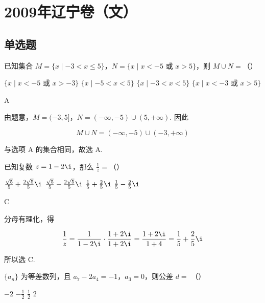 \chapter{2009年辽宁卷（文）}

\section{单选题}

\begin{problem}
已知集合 \(M = \{x \mid -3 < x \leqslant 5\}\)，\(N = \{x \mid x < -5\text{ 或 }x > 5\}\)，则 \(M \cup N =\)（\quad）

\choices
    {\(\{x\mid x < -5\text{ 或 }x > -3\}\)}
    {\(\{x\mid -5 < x < 5\}\)}
    {\(\{x\mid -3 < x < 5\}\)}
    {\(\{x\mid x < -3\text{ 或 }x > 5\}\)}
\end{problem}

\begin{answer}
A
\end{answer}

\begin{solution}
由题意，\(M=(-3,5]\)，\(N=(-\infty,-5)\cup(5,+\infty)\). 因此

\[
M\cup N=(-\infty,-5)\cup(-3,+\infty)
\]

与选项 A 的集合相同，故选 A.
\end{solution}

\begin{problem}
已知复数 \(z = 1 - 2\i\)，那么 \(\frac{1}{z} =\)（\quad）

\choices
    {\(\frac{\sqrt{5}}{5} + \frac{2\sqrt{5}}{5}\i\)}
    {\(\frac{\sqrt{5}}{5} -\frac{2\sqrt{5}}{5}\i\)}
    {\(\frac{1}{5} +\frac{2}{5}\i\)}
    {\(\frac{1}{5} -\frac{2}{5}\i\)}
\end{problem}

\begin{answer}
C
\end{answer}

\begin{solution}
分母有理化，得

\[
\frac{1}{z}=\frac{1}{1-2\i}\cdot\frac{1+2\i}{1+2\i}
 =\frac{1+2\i}{1+4}=\frac{1}{5}+\frac{2}{5}\i
\]

所以选 C.
\end{solution}

\begin{problem}
\(\{a_{n}\}\) 为等差数列，且 \(a_7 - 2a_4 = -1\)，\(a_3 = 0\)，则公差 \(d =\) （\quad）

\choices
    {\(-2\)}
    {\(-\frac{1}{2}\)}
    {\(\frac{1}{2}\)}
    {\(2\)}
\end{problem}

